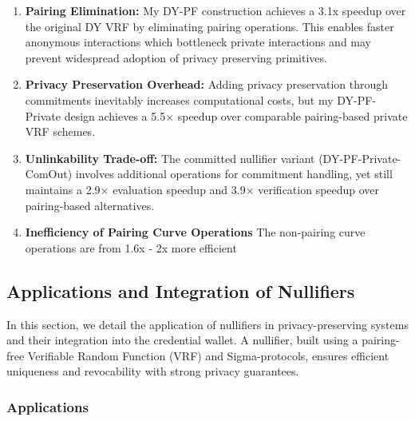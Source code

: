 \begin{enumerate}
    \item \textbf{Pairing Elimination:} My DY-PF construction achieves a 3.1x speedup over the original DY VRF by eliminating pairing operations. This enables faster anonymous interactions which bottleneck private interactions and may prevent widespread adoption of privacy preserving primitives.
    
    \item \textbf{Privacy Preservation Overhead:} Adding privacy preservation through commitments inevitably increases computational costs, but my DY-PF-Private design achieves a 5.5× speedup over comparable pairing-based private VRF schemes.
    
    \item \textbf{Unlinkability Trade-off:} The committed nullifier variant (DY-PF-Private-ComOut) involves additional operations for commitment handling, yet still maintains a 2.9× evaluation speedup and 3.9× verification speedup over pairing-based alternatives.

    \item \textbf{Inefficiency of Pairing Curve Operations} The non-pairing curve operations are from 1.6x - 2x more efficient
\end{enumerate}

















\subsection{Applications and Integration of Nullifiers}\label{sec-vrf-instantiation}

In this section, we detail the application of nullifiers in privacy-preserving systems and their integration into the credential wallet. A nullifier, built using a pairing-free Verifiable Random Function (VRF) and Sigma-protocols, ensures efficient uniqueness and revocability with strong privacy guarantees.

\subsubsection{Applications}

